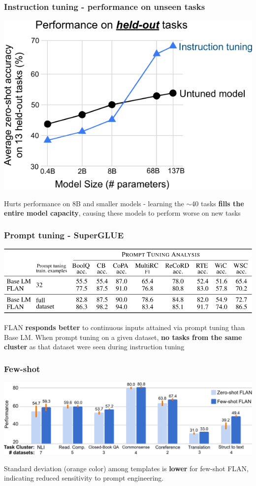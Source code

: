 \documentclass{beamer}
\begin{document}
\begin{frame}
    \frametitle{Instruction tuning - performance on \textbf{unseen} tasks}
    \begin{center}
        \includegraphics[scale=1.5]{img/performance_2.png}
    \end{center}
    \footnotesize Hurts performance on 8B and smaller models - learning the $\sim$40 tasks \textbf{fills the entire model capacity}, causing these models to perform worse on new tasks
\end{frame}

\begin{frame}
    \frametitle{Prompt tuning - SuperGLUE}
    \begin{center}
        \includegraphics[scale=1.5]{img/prompting_analysis.png}
    \end{center}
    \footnotesize FLAN \textbf{responds better} to continuous inputs attained via prompt tuning than Base LM. When prompt tuning on a given dataset, \textbf{no tasks from the same cluster} as that dataset were seen during instruction tuning
\end{frame}

\begin{frame}
    \frametitle{Few-shot}
    \begin{center}
        \includegraphics[scale=1.25]{img/performance_final.png}
    \end{center}
    \footnotesize Standard deviation (orange color) among templates is \textbf{lower} for few-shot FLAN, indicating reduced sensitivity to prompt engineering.
\end{frame}
\end{document}
